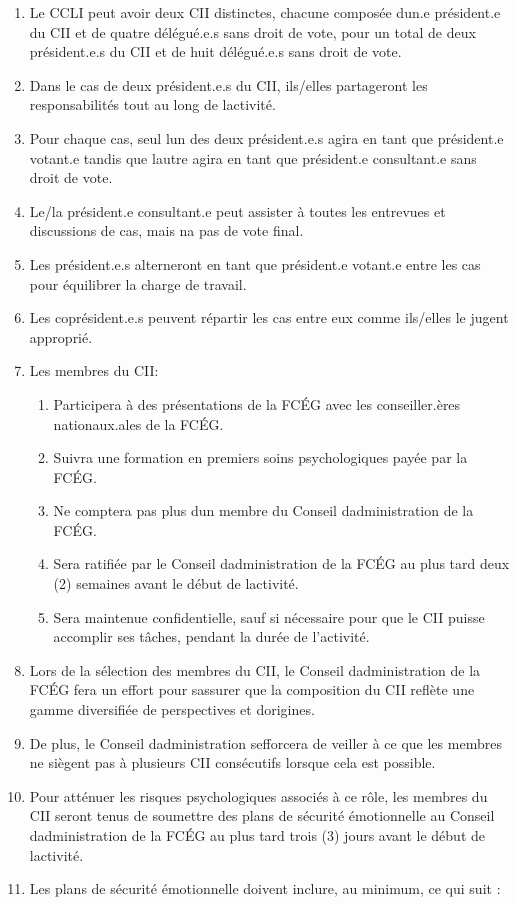 \begin{enumerate}
 \item
  Le CCLI peut avoir deux CII distinctes, chacune composée d\textquotesingle un.e président.e du CII et de quatre délégué.e.s sans droit de vote, pour un total de deux président.e.s du CII et de huit délégué.e.s sans droit de vote.
 \item
  Dans le cas de deux président.e.s du CII, ils/elles partageront les responsabilités tout au long de l\textquotesingle activité.
 \item
  Pour chaque cas, seul l\textquotesingle un des deux président.e.s agira en tant que président.e votant.e tandis que l\textquotesingle autre agira en tant que président.e consultant.e sans droit de vote.
 \item
  Le/la président.e consultant.e peut assister à toutes les entrevues et discussions de cas, mais n\textquotesingle a pas de vote final.
 \item
  Les président.e.s alterneront en tant que président.e votant.e entre les cas pour équilibrer la charge de travail.
 \item
  Les coprésident.e.s peuvent répartir les cas entre eux comme ils/elles le jugent approprié.
 \item
  Les membres du CII:

  \begin{enumerate}
   \item
    Participera à des présentations de la FCÉG avec les conseiller.ères nationaux.ales de la FCÉG.
   \item
    Suivra une formation en premiers soins psychologiques payée par la FCÉG.
   \item
    Ne comptera pas plus d\textquotesingle un membre du Conseil d\textquotesingle administration de la FCÉG.
   \item
    Sera ratifiée par le Conseil d\textquotesingle administration de la FCÉG au plus tard deux (2) semaines avant le début de l\textquotesingle activité.
   \item
    Sera maintenue confidentielle, sauf si nécessaire pour que le CII puisse accomplir ses tâches, pendant la durée de l'activité.
  \end{enumerate}
 \item
  Lors de la sélection des membres du CII, le Conseil d\textquotesingle administration de la FCÉG fera un effort pour s\textquotesingle assurer que la composition du CII reflète une gamme diversifiée de perspectives et d\textquotesingle origines.
 \item
  De plus, le Conseil d\textquotesingle administration s\textquotesingle efforcera de veiller à ce que les membres ne siègent pas à plusieurs CII consécutifs lorsque cela est possible.
 \item
  Pour atténuer les risques psychologiques associés à ce rôle, les membres du CII seront tenus de soumettre des plans de sécurité émotionnelle au Conseil d\textquotesingle administration de la FCÉG au plus tard trois (3) jours avant le début de l\textquotesingle activité.
 \item
  Les plans de sécurité émotionnelle doivent inclure, au minimum, ce qui suit :


\end{enumerate}
